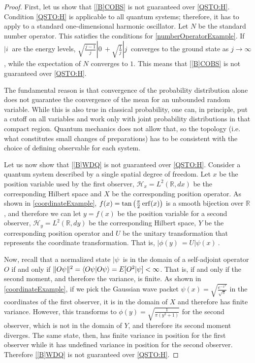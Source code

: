 \documentclass{techbrief}
\begin{document}
\begin{proof}
	First, let us show that \ref{[B]COBS} is not guaranteed over \ref{QSTO:H}. Condition \ref{QSTO:H} is applicable to all quantum systems; therefore, it has to apply to a standard one-dimensional harmonic oscillator. Let $N$ be the standard number operator. This satisfies the conditions for \ref{numberOperatorExample}. If $|i\>$ are the energy levels, $\sqrt{\frac{j-1}{j}}|0\> + \sqrt{\frac{1}{j}}|j\>$ converges to the ground state as $j \to \infty$, while the expectation of $N$ converges to $1$. This means that \ref{[B]COBS} is not guaranteed over \ref{QSTO:H}.
	
	The fundamental reason is that convergence of the probability distribution alone does not guarantee the convergence of the mean for an unbounded random variable. While this is also true in classical probability, one can, in principle, put a cutoff on all variables and work only with joint probability distributions in that compact region. Quantum mechanics does not allow that, so the topology (i.e. what constitutes small changes of preparations) has to be consistent with the choice of defining observable for each system.
	
	Let us now show that \ref{[B]WDQ} is not guaranteed over \ref{QSTO:H}. Consider a quantum system described by a single spatial degree of freedom. Let $x$ be the position variable used by the first observer, $\mathcal{H}_x = L^2(\mathbb{R}, dx)$ be the corresponding Hilbert space and $X$ be the corresponding position operator. As shown in \ref{coordinateExample}, $f(x) = \tan\left(\frac{\pi}{2}\operatorname{erf}(x)\right)$ is a smooth bijection over $\mathbb{R}$, and therefore we can let $y = f(x)$ be the position variable for a second observer, $\mathcal{H}_y = L^2(\mathbb{R}, dy)$ be the corresponding Hilbert space, $Y$ be the corresponding position operator and $U$ be the unitary transformation that represents the coordinate transformation. That is, $|\phi(y)\> = U |\psi(x)\>$.
	
	Now, recall that a normalized state $|\psi\>$ is in the domain of a self-adjoint operator $O$ if and only if $\|O\psi\|^2 = \langle O \psi | O \psi \rangle = E[O^2 | \psi] < \infty$. That is, if and only if the second moment, and therefore the variance, is finite. As shown in \ref{coordinateExample}, if we pick the Gaussian wave packet $\psi(x) = \sqrt{\frac{e^{-x^2}}{\sqrt{\pi}}}$ in the coordinates of the first observer, it is in the domain of $X$ and therefore has finite variance. However, this transforms to $\phi(y) = \sqrt{\frac{1}{\pi (y^2 + 1)}}$ for the second observer, which is not in the domain of $Y$, and therefore its second moment diverges. The same state, then, has finite variance in position for the first observer while it has undefined variance in position for the second observer. Therefore \ref{[B]WDQ} is not guaranteed over \ref{QSTO:H}.
	

\end{proof}
\end{document}

